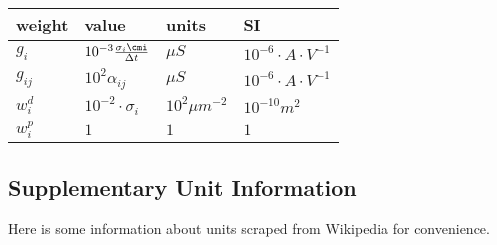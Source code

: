     \begin{center}

    \begin{tabular}{llll}
        \hline
        weight & value & units  & SI \\
        \hline
        $g_i$    & $10^{-3}\frac{\sigma_i \cmi}{\Delta t}$ & $\mu S$ & $10^{-6} \cdot A\cdot V^{-1}$ \\
        $g_{ij}$ & $10^2\alpha_{ij}$                       & $\mu S$ & $10^{-6} \cdot A\cdot V^{-1}$ \\
        $w_i^d$  & $10^{-2}\cdot\sigma_i$                  & $10^2\mu m^{-2}$ & $10^{-10}m^2$ \\
        $w_i^p$  & $1$                                     & $1$     & $1$ \\
        \hline
    \end{tabular}

    \end{center}
\subsection{Supplementary Unit Information}
Here is some information about units scraped from Wikipedia for convenience.


